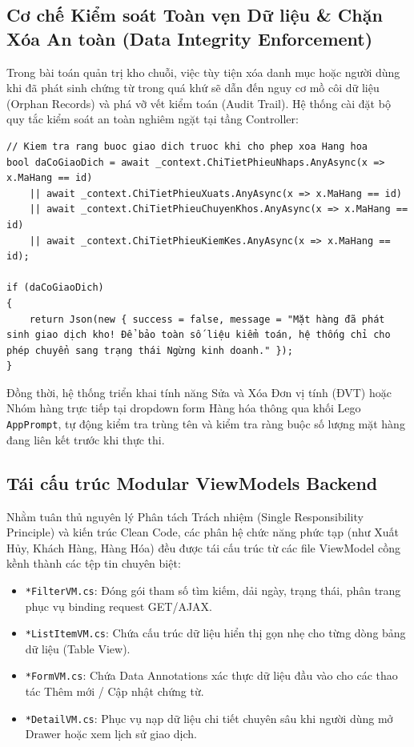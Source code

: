 \documentclass[12pt,a4paper]{report}
\renewcommand{\_}{\textunderscore\allowbreak}
\begin{document}
\subsection{Cơ chế Kiểm soát Toàn vẹn Dữ liệu \& Chặn Xóa An toàn (Data Integrity Enforcement)}
Trong bài toán quản trị kho chuỗi, việc tùy tiện xóa danh mục hoặc người dùng khi đã phát sinh chứng từ trong quá khứ sẽ dẫn đến nguy cơ mồ côi dữ liệu (Orphan Records) và phá vỡ vết kiểm toán (Audit Trail). Hệ thống cài đặt bộ quy tắc kiểm soát an toàn nghiêm ngặt tại tầng Controller:
\begin{lstlisting}[language={[Sharp]C}, caption={Cơ chế chặn xóa và ép buộc khóa trạng thái khi đã phát sinh chứng từ}]
// Kiem tra rang buoc giao dich truoc khi cho phep xoa Hang hoa
bool daCoGiaoDich = await _context.ChiTietPhieuNhaps.AnyAsync(x => x.MaHang == id)
    || await _context.ChiTietPhieuXuats.AnyAsync(x => x.MaHang == id)
    || await _context.ChiTietPhieuChuyenKhos.AnyAsync(x => x.MaHang == id)
    || await _context.ChiTietPhieuKiemKes.AnyAsync(x => x.MaHang == id);

if (daCoGiaoDich)
{
    return Json(new { success = false, message = "Mặt hàng đã phát sinh giao dịch kho! Để bảo toàn số liệu kiểm toán, hệ thống chỉ cho phép chuyển sang trạng thái Ngừng kinh doanh." });
}
\end{lstlisting}
Đồng thời, hệ thống triển khai tính năng Sửa và Xóa Đơn vị tính (ĐVT) hoặc Nhóm hàng trực tiếp tại dropdown form Hàng hóa thông qua khối Lego \texttt{AppPrompt}, tự động kiểm tra trùng tên và kiểm tra ràng buộc số lượng mặt hàng đang liên kết trước khi thực thi.

\subsection{Tái cấu trúc Modular ViewModels Backend}
Nhằm tuân thủ nguyên lý Phân tách Trách nhiệm (Single Responsibility Principle) và kiến trúc Clean Code, các phân hệ chức năng phức tạp (như Xuất Hủy, Khách Hàng, Hàng Hóa) đều được tái cấu trúc từ các file ViewModel cồng kềnh thành các tệp tin chuyên biệt:
\begin{itemize}
    \item \texttt{*FilterVM.cs}: Đóng gói tham số tìm kiếm, dải ngày, trạng thái, phân trang phục vụ binding request GET/AJAX.
    \item \texttt{*ListItemVM.cs}: Chứa cấu trúc dữ liệu hiển thị gọn nhẹ cho từng dòng bảng dữ liệu (Table View).
    \item \texttt{*FormVM.cs}: Chứa Data Annotations xác thực dữ liệu đầu vào cho các thao tác Thêm mới / Cập nhật chứng từ.
    \item \texttt{*DetailVM.cs}: Phục vụ nạp dữ liệu chi tiết chuyên sâu khi người dùng mở Drawer hoặc xem lịch sử giao dịch.
\end{itemize}
\end{document}
